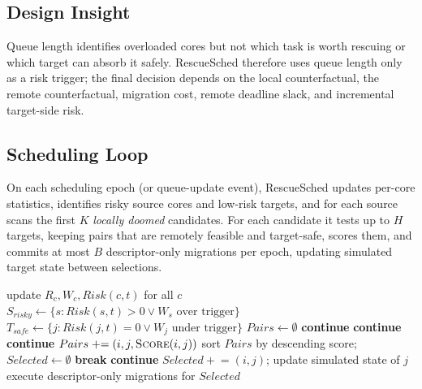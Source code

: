 \subsection{Design Insight}
Queue length identifies overloaded cores but not which task is worth
rescuing or which target can absorb it safely. RescueSched therefore uses
queue length only as a risk trigger; the final decision depends on the
local counterfactual, the remote counterfactual, migration cost, remote
deadline slack, and incremental target-side risk.

\subsection{Scheduling Loop}
On each scheduling epoch (or queue-update event), RescueSched updates
per-core statistics, identifies risky source cores and low-risk targets,
and for each source scans the first $K$ \emph{locally doomed} candidates.
For each candidate it tests up to $H$ targets, keeping pairs that are
remotely feasible and target-safe, scores them, and commits at most $B$
descriptor-only migrations per epoch, updating simulated target state
between selections.

\begin{algorithm}[t]
\caption{RescueSched main loop (per epoch $t$)}
\label{alg:main}
\begin{algorithmic}[1]
\STATE update $R_c,W_c,Risk(c,t)$ for all $c$
\STATE $S_{risky}\!\gets\!\{s: Risk(s,t)\!>\!0 \lor W_s \text{ over trigger}\}$
\STATE $T_{safe}\!\gets\!\{j: Risk(j,t)\!=\!0 \lor W_j \text{ under trigger}\}$
\STATE $Pairs \gets \emptyset$
     \STATE \textbf{continue} \ENDIF
       \STATE \textbf{continue} \ENDIF
       \STATE \textbf{continue} \ENDIF
      \STATE $Pairs \mathrel{+}= (i,j,\textsc{Score}(i,j))$
    \ENDFOR
  \ENDFOR
\ENDFOR
\STATE sort $Pairs$ by descending score; $Selected \gets \emptyset$
   \STATE \textbf{break} \ENDIF
   \STATE \textbf{continue} \ENDIF
  \STATE $Selected \mathrel{+}= (i,j)$; update simulated state of $j$
\ENDFOR
\STATE execute descriptor-only migrations for $Selected$
\end{algorithmic}
\end{algorithm}

